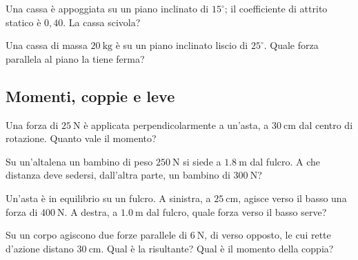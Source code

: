 \begin{esercizio}
Una cassa è appoggiata su un piano inclinato di $15^\circ$; il coefficiente di attrito statico è $0,40$. La cassa scivola?\\
\end{esercizio}

\begin{esercizio}
Una cassa di massa $\SI{20}{\kilo\gram}$ è su un piano inclinato liscio di $25^\circ$. Quale forza parallela al piano la tiene ferma?\\
\end{esercizio}

\subsection*{Momenti, coppie e leve}

\begin{esercizio}
Una forza di $\SI{25}{\newton}$ è applicata perpendicolarmente a un'asta, a $\SI{30}{\centi\meter}$ dal centro di rotazione. Quanto vale il momento?\\
\end{esercizio}

\begin{esercizio}
Su un'altalena un bambino di peso $\SI{250}{\newton}$ si siede a $\SI{1,8}{\meter}$ dal fulcro. A che distanza deve sedersi, dall'altra parte, un bambino di $\SI{300}{\newton}$?\\
\end{esercizio}

\begin{esercizio}
Un'asta è in equilibrio su un fulcro. A sinistra, a $\SI{25}{\centi\meter}$, agisce verso il basso una forza di $\SI{400}{\newton}$. A destra, a $\SI{1,0}{\meter}$ dal fulcro, quale forza verso il basso serve?\\
\end{esercizio}

\begin{esercizio}
Su un corpo agiscono due forze parallele di $\SI{6}{\newton}$, di verso opposto, le cui rette d'azione distano $\SI{30}{\centi\meter}$. Qual è la risultante? Qual è il momento della coppia?\\
\end{esercizio}


